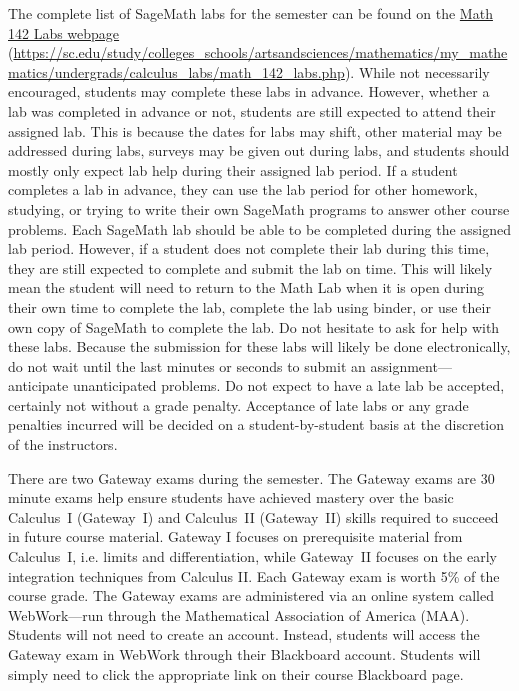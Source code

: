 \documentclass[11pt,letterpaper]{article}
\begin{document}
The complete list of SageMath labs for the semester can be found on the \href{https://sc.edu/study/colleges\_schools/artsandsciences/mathematics/my\_mathematics/undergrads/calculus\_labs/math\_142\_labs.php}{Math 142 Labs webpage} (\url{https://sc.edu/study/colleges\_schools/artsandsciences/mathematics/my\_mathematics/undergrads/calculus\_labs/math\_142\_labs.php}). While not necessarily encouraged, students may complete these labs in advance. However, whether a lab was completed in advance or not, students are still expected to attend their assigned lab. This is because the dates for labs may shift, other material may be addressed during labs, surveys may be given out during labs, and students should mostly only expect lab help during their assigned lab period. If a student completes a lab in advance, they can use the lab period for other homework, studying, or trying to write their own SageMath programs to answer other course problems. Each SageMath lab should be able to be completed during the assigned lab period. However, if a student does not complete their lab during this time, they are still expected to complete and submit the lab on time. This will likely mean the student will need to return to the Math Lab when it is open during their own time to complete the lab, complete the lab using binder, or use their own copy of SageMath to complete the lab. Do not hesitate to ask for help with these labs. Because the submission for these labs will likely be done electronically, do not wait until the last minutes or seconds to submit an assignment---anticipate unanticipated problems. Do not expect to have a late lab be accepted, certainly not without a grade penalty. Acceptance of late labs or any grade penalties incurred will be decided on a student-by-student basis at the discretion of the instructors. 
\sectionbreak




There are two Gateway exams during the semester. The Gateway exams are 30 minute exams help ensure students have achieved mastery over the basic Calculus~I (Gateway~I) and Calculus~II (Gateway~II) skills required to succeed in future course material. Gateway I focuses on prerequisite material from Calculus~I, i.e. limits and differentiation, while Gateway~II focuses on the early integration techniques from Calculus II. Each Gateway exam is worth 5\% of the course grade. The Gateway exams are administered via an online system called WebWork---run through the Mathematical Association of America (MAA). Students will not need to create an account. Instead, students will access the Gateway exam in WebWork through their Blackboard account. Students will simply need to click the appropriate link on their course Blackboard page. \pspace
\end{document}
